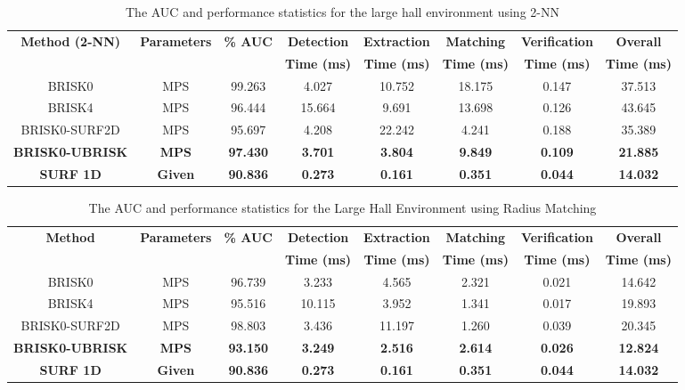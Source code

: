 \documentclass[11pt]{report}
\begin{document}
\begin{table}
\caption{The AUC and performance statistics for the large hall environment
using 2-NN}
\footnotesize
\begin{tabular}{|c|c|c|c|c|c|c|c|}
\hline 
\textbf{Method (2-NN)} & \textbf{Parameters} & \textbf{\% AUC} & \textbf{Detection} & \textbf{Extraction} & \textbf{Matching} & \textbf{Verification} & \textbf{Overall}\tabularnewline
 &  &  & \textbf{Time (ms)} & \textbf{Time (ms)} & \textbf{Time (ms)} & \textbf{Time (ms)} & \textbf{Time (ms)}\tabularnewline
\hline 
\hline 
BRISK0 & MPS & 99.263 & 4.027 & 10.752 & 18.175 & 0.147 & 37.513\tabularnewline
\hline 
BRISK4 & MPS & 96.444 & 15.664 & 9.691 & 13.698 & 0.126 & 43.645\tabularnewline
\hline 
BRISK0-SURF2D & MPS & 95.697 & 4.208 & 22.242 & 4.241 & 0.188 & 35.389\tabularnewline
\hline 
\textbf{BRISK0-UBRISK} & \textbf{MPS} & \textbf{97.430} & \textbf{3.701} & \textbf{3.804} & \textbf{9.849} & \textbf{0.109} & \textbf{21.885}\tabularnewline
\hline 
\textbf{SURF 1D} & \textbf{Given} & \textbf{90.836} & \textbf{0.273} & \textbf{0.161} & \textbf{0.351} & \textbf{0.044} & \textbf{14.032}\tabularnewline
\hline 
\end{tabular}
\label{tab:lh_knn}
\end{table}


\begin{table}
\caption{The AUC and performance statistics for the Large Hall Environment
using Radius Matching}
\footnotesize
\begin{tabular}{|c|c|c|c|c|c|c|c|}
\hline 
\textbf{Method} & \textbf{Parameters} & \textbf{\% AUC} & \textbf{Detection} & \textbf{Extraction} & \textbf{Matching} & \textbf{Verification} & \textbf{Overall}\tabularnewline
 &  &  & \textbf{Time (ms)} & \textbf{Time (ms)} & \textbf{Time (ms)} & \textbf{Time (ms)} & \textbf{Time (ms)}\tabularnewline
\hline 
\hline 
BRISK0 & MPS & 96.739 & 3.233 & 4.565 & 2.321 & 0.021 & 14.642\tabularnewline
\hline 
BRISK4 & MPS & 95.516 & 10.115 & 3.952 & 1.341 & 0.017 & 19.893\tabularnewline
\hline 
BRISK0-SURF2D & MPS & 98.803 & 3.436 & 11.197 & 1.260 & 0.039 & 20.345\tabularnewline
\hline 
\textbf{BRISK0-UBRISK} & \textbf{MPS} & \textbf{93.150} & \textbf{3.249} & \textbf{2.516} & \textbf{2.614} & \textbf{0.026} & \textbf{12.824}\tabularnewline
\hline 
\textbf{SURF 1D} & \textbf{Given} & \textbf{90.836} & \textbf{0.273} & \textbf{0.161} & \textbf{0.351} & \textbf{0.044} & \textbf{14.032}\tabularnewline
\hline 
\end{tabular}
\label{tab:lh_hamming}
\end{table}
\end{document}
